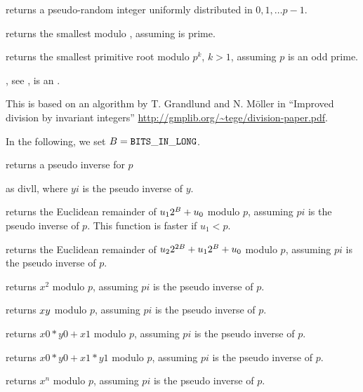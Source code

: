  returns a pseudo-random integer uniformly
distributed in $0, 1, \dots p-1$.

 returns the smallest 
modulo , assuming  is prime.

 returns the smallest primitive root modulo
$p^k$, $k > 1$, assuming $p$ is an odd prime.

, see ,
 is an .


This is based on an algorithm by T. Grandlund and N. M\"{o}ller in
``Improved division by invariant integers''
\url{http://gmplib.org/~tege/division-paper.pdf}.

In the following, we set $B={\tt BITS\_IN\_LONG}$.

 returns a pseudo inverse  for $p$

as divll, where $yi$ is the pseudo inverse of $y$.

 returns
the Euclidean remainder of $u_1\*2^B+u_0$ modulo $p$, assuming $pi$ is the
pseudo inverse of $p$.  This function is faster if $u_1 < p$.

returns the Euclidean remainder of $u_2\*2^{2\*B}+u_1\*2^{B}+u_0$ modulo $p$,
assuming $pi$ is the pseudo inverse of $p$.

 returns $x^2$ modulo $p$,
assuming $pi$ is the pseudo inverse of $p$.

 returns $x\*y$
modulo $p$, assuming $pi$ is the pseudo inverse of $p$.

returns $x0*y0+x1$ modulo $p$, assuming $pi$ is the pseudo inverse of $p$.

returns $x0*y0+x1*y1$ modulo $p$, assuming $pi$ is the pseudo inverse of $p$.

 returns
$x^n$ modulo $p$, assuming $pi$ is the pseudo inverse of $p$.

